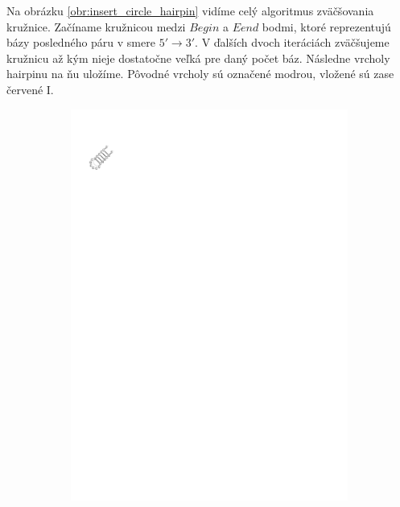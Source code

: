 Na obrázku \ref{obr:insert_circle_hairpin} vidíme celý algoritmus zväčšovania kružnice.
Začíname kružnicou medzi $Begin$ a $Eend$ bodmi, ktoré reprezentujú bázy posledného
páru v smere $5' \to 3'$. V ďalších dvoch iteráciách zväčšujeme kružnicu až kým
nieje dostatočne veľká pre daný počet báz. Následne vrcholy hairpinu
na ňu uložíme.
Pôvodné vrcholy sú označené modrou, vložené sú zase červené I.

\renewcommand{\wi}{0.24\textwidth}

\begin{figure}
  \begin{subfigure}{\wi}
    \includegraphics[trim=1cm 24.5cm 17.5cm 2.5cm]{../img/alg/insert/1/circle-small-begin}
  \end{subfigure}
  \begin{subfigure}{\wi}

\end{subfigure}
\end{figure}
